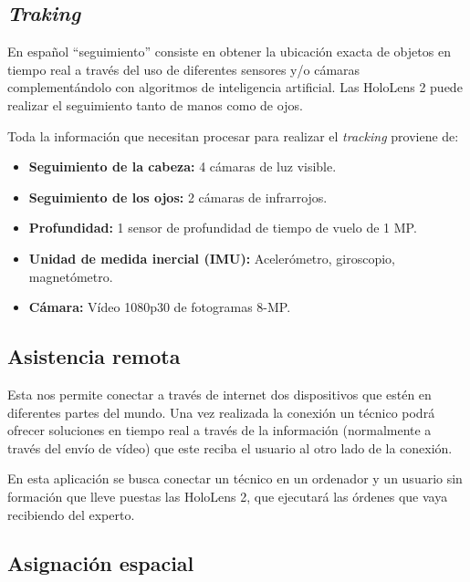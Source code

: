 \subsection{\textit{Traking}}

En español “seguimiento” \cite{microsoft:seguimientomanos,microsoft:seguimientoojos} consiste en obtener la ubicación exacta de objetos en tiempo real a través del uso de diferentes sensores y/o cámaras complementándolo con algoritmos de inteligencia artificial.
Las HoloLens 2 puede realizar el seguimiento tanto de manos como de ojos. 


Toda la información que necesitan procesar para realizar el \textit{tracking} proviene de:
\begin{itemize}
	\item\textbf{Seguimiento de la cabeza:} 4 cámaras de luz visible.
	\item\textbf{Seguimiento de los ojos:} 2 cámaras de infrarrojos.
	\item\textbf{Profundidad:} 1 sensor de profundidad de tiempo de vuelo de 1 MP.
	\item\textbf{Unidad de medida inercial (IMU):} Acelerómetro, giroscopio, magnetómetro.
	\item\textbf{Cámara:} Vídeo 1080p30 de fotogramas 8-MP.
\end{itemize}



\subsection{Asistencia remota}

Esta nos permite conectar a través de internet dos dispositivos que estén en diferentes partes del mundo. Una vez realizada la conexión un técnico podrá ofrecer soluciones en tiempo real a través de la información (normalmente a través del envío de vídeo) que este reciba el usuario al otro lado de la conexión.

En esta aplicación se busca conectar un técnico en un ordenador y un usuario sin formación que lleve puestas las HoloLens 2, que ejecutará las órdenes que vaya recibiendo del experto.

\subsection{Asignación espacial}

